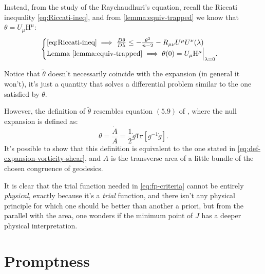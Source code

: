 	Instead, from the study of the Raychaudhuri's equation, recall the Riccati inequality \eqref{eq:Riccati-ineq}, and from \ref{lemma:equiv-trapped} we know that \(\theta = U_{\mu}\mathrm{H}^{\mu}\):
	\[
	\begin{cases}
	\eqref{eq:Riccati-ineq} \implies \frac{D\theta}{D\lambda} \le -\frac{\theta^2}{n - 2} - R_{\mu\nu}U^{\mu}U^{\nu}(\lambda) \\
	\text{Lemma }\ref{lemma:equiv-trapped} \implies \theta(0) = U_{\mu}\mathrm{H}^{\mu}\Big\vert_{\lambda = 0}.
	\end{cases}	
	\]
	
	\begin{remark}
		Notice that \(\tilde{\theta}\) doesn't necessarily coincide with the expansion (in general it won't), it's just a quantity that solves a differential problem similar to the one satisfied by \(\theta\). 
		
		However, the definition of \(\tilde{\theta}\) resembles equation \((5.9)\) of \cite{witten2020light}, where the null expansion is defined as:
		\[
		\theta = \frac{\dot{A}}{A} = \frac{1}{2}\dot{g}\texttt{Tr}\left[g^{-1}\dot{g}\right].
		\]
		It's possible to show that this definition is equivalent to the one stated in \eqref{eq:def-expansion-vorticity-shear}, and \(A\) is the transverse area of a little bundle of the chosen congruence of geodesics.
		
		It is clear that the trial function needed in \ref{eq:fp-criteria} cannot be entirely \emph{physical}, exactly because it's a \emph{trial} function, and there isn't any physical principle for which one should be better than another a priori, but from the parallel with the area, one wonders if the minimum point of \(J\) has a deeper physical interpretation.
	\end{remark}

\section{Promptness}

	
	
	
	
	
	

	
	
	
	
	



